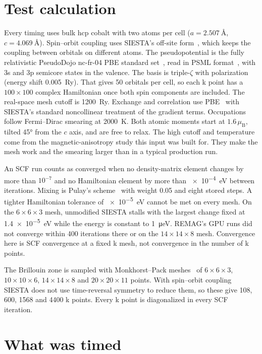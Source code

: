\section*{Test calculation}

Every timing uses bulk hcp cobalt with two atoms per cell
($a=\SI{2.507}{\angstrom}$, $c=\SI{4.069}{\angstrom}$). Spin--orbit coupling
uses SIESTA's off-site form~\citep{Cuadrado2012}, which keeps the coupling between orbitals on
different atoms. The pseudopotential is the fully relativistic PseudoDojo
nc-fr-04 PBE standard set~\citep{vanSetten2018}, read in PSML format~\citep{Garcia2018}, with 3s and 3p semicore states in the valence. The
basis is triple-$\zeta$ with polarization (energy shift \SI{0.005}{Ry}). That
gives 50 orbitals per cell, so each k point has a $100\times100$ complex
Hamiltonian once both spin components are included. The real-space mesh
cutoff is \SI{1200}{Ry}. Exchange and correlation use PBE~\citep{Perdew1996} with SIESTA's
standard noncollinear treatment of the gradient terms. Occupations follow
Fermi--Dirac smearing at \SI{2000}{K}. Both atomic moments start at
$1.6\,\mu_\mathrm{B}$, tilted \ang{45} from the $c$ axis, and are free to
relax. The high cutoff and temperature come from the magnetic-anisotropy
study this input was built for. They make the mesh work and the smearing larger
than in a typical production run.

An SCF run counts as converged when no density-matrix element changes by more
than $10^{-7}$ and no Hamiltonian element by more than \SI{e-4}{eV} between
iterations. Mixing is Pulay's scheme~\citep{Pulay1980} with weight 0.05 and eight stored steps. A tighter
Hamiltonian tolerance of \SI{e-5}{eV} cannot be met on every mesh. On the
$6\times6\times3$ mesh, unmodified SIESTA stalls with the largest change fixed
at \SI{1.4e-5}{eV} while the energy is constant to \SI{1}{\micro eV}. REMAG's GPU
runs did not converge within 400 iterations there or on the $14\times14\times8$
mesh. Convergence here
is SCF convergence at a fixed k mesh, not convergence in the number of k points.

The Brillouin zone is sampled with Monkhorst--Pack meshes~\citep{Monkhorst1976} of $6\times6\times3$,
$10\times10\times6$, $14\times14\times8$ and $20\times20\times11$ points. With
spin--orbit coupling SIESTA does not use time-reversal symmetry to reduce
them, so these give \num{108}, \num{600}, \num{1568} and \num{4400} k points.
Every k point is diagonalized in every SCF iteration.

\section*{What was timed}

